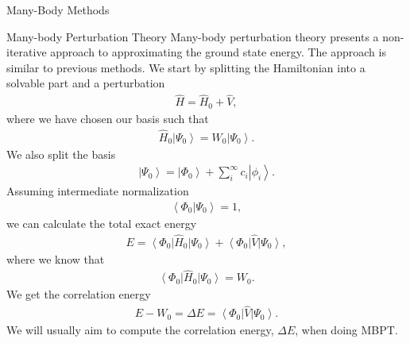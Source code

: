 \documentclass[twoside,english]{uiofysmaster}
\begin{document}
\begin{chapter}{Many-Body Methods}
	\begin{section}{Many-body Perturbation Theory}
		Many-body perturbation theory presents a non-iterative approach to approximating the ground state energy. The approach is similar to previous methods. We start by splitting the Hamiltonian into a solvable part and a perturbation 
	 	\begin{align}
	 		\hat H = \hat H_0 + \hat V,
	 	\end{align}
	 	where we have chosen our basis such that
	 	\begin{align}
	 		\hat H_0 \left| \Psi_0 \right>  = W_0 \left| \Psi_0 \right>.
	 	\end{align}
	 	We also split the basis
	 	\begin{align}
	 		\left| \Psi_0 \right> = \left| \Phi_0 \right> + \sum_i^{\infty} c_i \left| \phi_i \right>.
	 	\end{align}
	 	Assuming intermediate normalization
	 	\begin{align}
	 		\left< \Phi_0 | \Psi_0 \right> = 1,
	 	\end{align}
		we can calculate the total exact energy
	 	\begin{align}
	 		E = \left< \Phi_0 \right| \hat H_0 \left| \Psi_0 \right> + \left< \Phi_0 \right| \hat V \left| \Psi_0 \right>,
	 	\end{align}
	 	where we know that
	 	\begin{align}
	 		 \left< \Phi_0 \right| \hat H_0 \left| \Psi_0 \right>  = W_0.
	 	\end{align}
	 	We get the correlation energy
	 	\begin{align}
	 		E - W_0 = \Delta E = \left< \Phi_0 \right| \hat V \left| \Psi_0 \right>.
	 	\end{align}
	 	We will usually aim to compute the correlation energy, $\Delta E$, when doing MBPT. 


\end{section}
\end{chapter}
\end{document}
